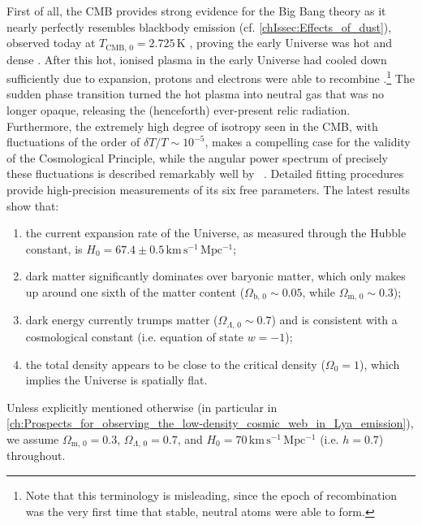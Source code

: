 First of all, the CMB provides strong evidence for the Big Bang theory as it nearly perfectly resembles blackbody emission (cf. \cref{chIssec:Effects_of_dust}), observed today at $T_{\text{CMB}, \, 0} = 2.725 \, \mathrm{K}$ \citep[e.g.][]{2009ApJ...707..916F}, proving the early Universe was hot and dense \citep[in fact, the existence of the CMB in a Big Bang model had been predicted before its discovery;][]{1949RvMP...21..367G}. After this hot, ionised plasma in the early Universe had cooled down sufficiently due to expansion, protons and electrons were able to recombine \citep[at a redshift of $z \sim \num{1100}$; e.g.][]{1985A&A...149..144J}.\footnote{Note that this terminology is misleading, since the epoch of recombination was the very first time that stable, neutral atoms were able to form.} The sudden phase transition turned the hot plasma into neutral gas that was no longer opaque, releasing the (henceforth) ever-present relic radiation. Furthermore, the extremely high degree of isotropy seen in the CMB, with fluctuations of the order of $\delta T / T \sim 10^{-5}$, makes a compelling case for the validity of the Cosmological Principle, while the angular power spectrum of precisely these fluctuations is described remarkably well by \LCDM\ \citep{2020A&A...641A...1P}. Detailed fitting procedures provide high-precision measurements of its six free parameters. The latest results \citep[e.g.][]{2020A&A...641A...6P} show that:
\begin{enumerate}[label=(\roman*)]
    \item the current expansion rate of the Universe, as measured through the Hubble constant, is $H_0 = 67.4 \pm 0.5 \, \mathrm{km \, s^{-1} \, Mpc^{-1}}$;
    \item dark matter significantly dominates over baryonic matter, which only makes up around one sixth of the matter content ($\Omega_{\text{b}, \, 0} \sim 0.05$, while $\Omega_{\text{m}, \, 0} \sim 0.3$);
    \item dark energy currently trumps matter ($\Omega_{\Lambda, \, 0} \sim 0.7$) and is consistent with a cosmological constant (i.e. equation of state $w = -1$);
    \item the total density appears to be close to the critical density ($\Omega_0 = 1$), which implies the Universe is spatially flat.
\end{enumerate}

Unless explicitly mentioned otherwise (in particular in \cref{ch:Prospects_for_observing_the_low-density_cosmic_web_in_Lya_emission}), we assume $\Omega_{\text{m}, \, 0} = 0.3$, $\Omega_{\Lambda, \, 0} = 0.7$, and $H_0 = 70 \, \mathrm{km \, s^{-1} \, Mpc^{-1}}$ (i.e. $h = 0.7$) throughout.

